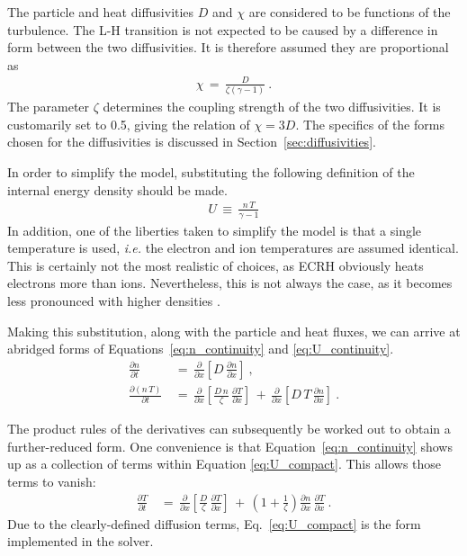 The particle and heat diffusivities $D$ and $\chi$ are considered to be functions of the turbulence.
The L-H transition is not expected to be caused by a difference in form between the two diffusivities.
It is therefore assumed they are proportional as 
\begin{align} %
	\chi \,=\, \frac{D}{\zeta (\gamma - 1)} \label{eq:heat_particle_diff_relation}~.
\end{align}
The parameter $\zeta$ determines the coupling strength of the two diffusivities.
It is customarily set to 0.5, giving the relation of $\chi = 3 D$.
The specifics of the forms chosen for the diffusivities is discussed in Section~\ref{sec:diffusivities}.

In order to simplify the model, substituting the following definition of the internal energy density should be made.
\begin{align} %
	U \,\equiv\, \frac{n \, T}{\gamma - 1} \label{eq:U_definition}
\end{align}
In addition, one of the liberties taken to simplify the model is that a single temperature is used, \emph{i.e.} the electron and ion temperatures are assumed identical.
This is certainly not the most realistic of choices, as ECRH obviously heats electrons more than ions.
Nevertheless, this is not always the case, as it becomes less pronounced with higher densities \cite{sauter_l--_2012}.

Making this substitution, along with the particle and heat fluxes, we can arrive at abridged forms of Equations~\ref{eq:n_continuity} and \ref{eq:U_continuity}.
\begin{align} %
	\frac{\partial n}{\partial t} \,&=\, \frac{\partial}{\partial x} \left[D \,
		\frac{\partial n}{\partial x}\right]~,\label{eq:n_compact} \\
	\frac{\partial(n\,T)}{\partial t} \,&=\, \frac{\partial}{\partial x}
		\left[\frac{D\,n}{\zeta} \, \frac{\partial T}{\partial x}\right]
		\,+\, \frac{\partial}{\partial x} \left[D\,T \,
		\frac{\partial n}{\partial x}\right]~. \label{eq:U_compact}
\end{align}

The product rules of the derivatives can subsequently be worked out to obtain a further-reduced form.
One convenience is that Equation~\ref{eq:n_continuity} shows up as a collection of terms within Equation \ref{eq:U_compact}.
This allows those terms to vanish:
\begin{align} %
	\frac{\partial T}{\partial t} \,&=\, \frac{\partial}{\partial x}
		\left[\frac{D}{\zeta} \, \frac{\partial T}{\partial x}\right] \,+\,
		\left(1 + \frac{1}{\zeta}\right) \frac{\partial n}{\partial x} \,
		\frac{\partial T}{\partial x}~. \label{eq:T_compact}
\end{align}
Due to the clearly-defined diffusion terms, Eq.~\ref{eq:U_compact} is the form implemented in the solver.


